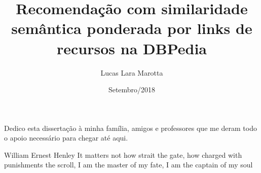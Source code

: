 \documentclass[pt,twoside,onehalfspacing,bsc]{risethesis}
\title{Recomendação com similaridade semântica ponderada por links de recursos na DBPedia}
\date{Setembro/2018}
\author{Lucas Lara Marotta}
\theoremstyle{definition}
\begin{document}
\frontmatter
\frontpage
\presentationpage

\begin{dedicatory}
Dedico esta dissertação à minha família, amigos e professores que me deram todo o apoio necessário para chegar até aqui.
\end{dedicatory}

\begin{epigraph}[]{William Ernest Henley}
It matters not how strait the gate, how charged with punishments the scroll, I am the master of my fate, I am the captain of my soul
\end{epigraph}

\resumo


\abstract


\tableofcontents

\listoffigures

\listoftables

\listofacronyms


\lstlistoflistings

\mainmatter










%
\end{document}
